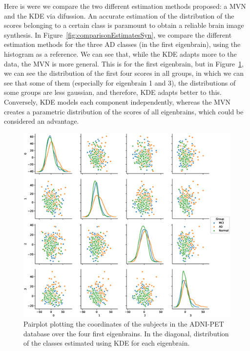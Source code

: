 Here is were we compare the two different estimation methods proposed: a \acf{MVN} and the \acf{KDE} via difussion. An accurate estimation of the distribution of the scores belonging to a certain class is paramount to obtain a reliable brain image synthesis. In Figure~\ref{fig:comparisonEstimatesSyn}, we compare the different estimation methods for the three \ac{AD} classes (in the first eigenbrain), using the histogram as a reference. We can see that, while the \ac{KDE} adapts more to the data, the \ac{MVN} is more general. This is for the first eigenbrain, but in Figure~\ref{fig:pairplot}, we can see the distribution of the first four scores in all groups, in which we can see that some of them (especially for eigenbrain 1 and 3), the distributions of some groups are less gaussian, and therefore, \ac{KDE} adapts better to this. Conversely, \ac{KDE} models each component independently, whereas the \ac{MVN} creates a parametric distribution of the scores of all eigenbrains, which could be considered an advantage. 

\begin{figure}[h]
	\centering
	\includegraphics[width=\linewidth]{Graphics/ch8/Pairplot}
	\caption{Pairplot plotting the coordinates of the subjects in the ADNI-PET database over the four first eigenbrains. In the diagonal, distribution of the classes estimated using \acs{KDE} for each eigenbrain.}
	\label{fig:pairplot}
\end{figure}

